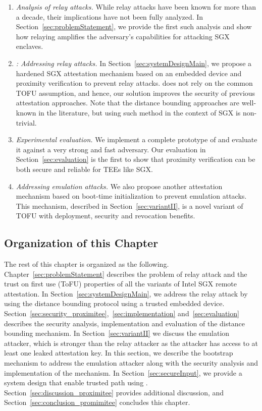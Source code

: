 \begin{enumerate}
    \item \emph{Analysis of relay attacks.} While relay attacks have been known for more than a decade, their implications have not been fully analyzed. In Section~\ref{sec:problemStatement}, we provide the first such analysis and show how relaying amplifies the adversary's capabilities for attacking SGX enclaves.   

    \item \emph{\name: Addressing relay attacks.} In Section~\ref{sec:systemDesignMain}, we propose a hardened SGX attestation mechanism based on an embedded device and proximity verification to prevent relay attacks. \name does not rely on the common TOFU assumption, and hence, our solution improves the security of previous attestation approaches. Note that the distance bounding approaches are well-known in the literature, but using such method in the context of SGX is non-trivial.
    
    \item \emph{Experimental evaluation.} We implement a complete prototype of \name and evaluate it against a very strong and fast adversary. Our evaluation in Section~\ref{sec:evaluation} is the first to show that proximity verification can be both secure and reliable for TEEs like SGX.
    
    \item \emph{Addressing emulation attacks.} We also propose another attestation mechanism based on boot-time initialization to prevent emulation attacks. This mechanism, described in Section~\ref{sec:variantII}, is a novel variant of TOFU with deployment, security and revocation benefits.
\end{enumerate}

\subsection{Organization of this Chapter}

The rest of this chapter is organized as the following. Chapter~\ref{sec:problemStatement} describes the problem of relay attack and the trust on first use (ToFU) properties of all the variants of Intel SGX remote attestation. In Section~\ref{sec:systemDesignMain}, we address the relay attack by using the distance bounding protocol using a trusted embedded device. Section~\ref{sec:security_proximitee},~\ref{sec:implementation} and~\ref{sec:evaluation} describes the security analysis, implementation and evaluation of the distance bounding mechanism. In Section~\ref{sec:variantII} we discuss the emulation attacker, which is stronger than the relay attacker as the attacker has access to at least one leaked attestation key. In this section, we describe the bootstrap mechanism to address the emulation attacker along with the security analysis and implementation of the mechanism. In Section~\ref{sec:secureInput}, we provide a system design that enable trusted path using \proximitee. Section~\ref{sec:discussion_proximitee} provides additional discussion, and Section~\ref{sec:conclusion_promimitee} concludes this chapter.



